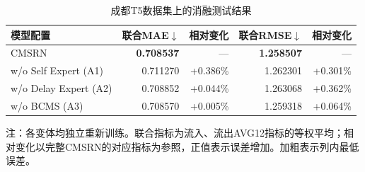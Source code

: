 \begin{table}[!htbp]
  \centering
  \caption{成都T5数据集上的消融测试结果}
  \label{tab:serr-expert-ablation}
  \begingroup
  \linespread{1}\fontsize{10}{12}\selectfont
  \setlength{\tabcolsep}{5pt}
  \renewcommand{\arraystretch}{1.05}
  \begin{tabular*}{\linewidth}{@{\extracolsep{\fill}}lrrrr@{}}
    \toprule
    模型配置 & 联合MAE$\downarrow$ & 相对变化 & 联合RMSE$\downarrow$ & 相对变化 \\
    \midrule
    CMSRN & \textbf{0.708537} & --- & \textbf{1.258507} & --- \\
    w/o Self Expert (A1) & 0.711270 & +0.386\% & 1.262301 & +0.301\% \\
    w/o Delay Expert (A2) & 0.708852 & +0.044\% & 1.263068 & +0.362\% \\
    w/o BCMS (A3) & 0.708570 & +0.005\% & 1.259318 & +0.064\% \\
    \bottomrule
  \end{tabular*}
  \par\vspace{3pt}
  \begin{minipage}{\linewidth}
  \footnotesize
  注：各变体均独立重新训练。联合指标为流入、流出AVG12指标的等权平均；相对变化以完整CMSRN的对应指标为参照，正值表示误差增加。加粗表示列内最低误差。
  \end{minipage}
  \endgroup
\end{table}
